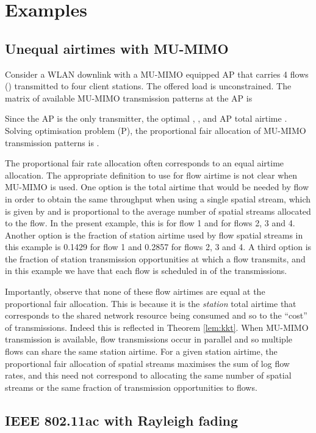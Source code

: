 \documentclass[11pt]{amsart}
\begin{document}
\section{Examples}\label{sec:examples}

\subsection{Unequal airtimes with MU-MIMO} \label{ex:unequal}   Consider a WLAN downlink with a MU-MIMO equipped AP that carries 4 flows () transmitted to four client stations.   The offered load is unconstrained.    The matrix of available MU-MIMO transmission patterns at the AP is

Since the AP is the only transmitter, the optimal , , and AP total airtime .   Solving optimisation problem (P), the proportional fair allocation of MU-MIMO transmission patterns is .    

The proportional fair rate allocation often corresponds to an equal airtime allocation.  The appropriate definition to use for flow airtime is not clear when MU-MIMO is used. One option is the total airtime that would be needed by flow  in order to obtain the same throughput when using a single spatial stream, which is given by  and is proportional to the average number of spatial streams allocated to the flow.   In the present example, this is  for flow 1 and  for flows 2, 3 and 4.  Another option is the fraction of station  airtime  used by flow  spatial streams in this example is 0.1429 for flow 1 and 0.2857 for flows 2, 3 and 4. A third option is the fraction of station transmission opportunities at which a flow transmits, and in this example we have that each flow is scheduled in  of the transmissions.   

Importantly, observe that none of these flow airtimes are equal at the proportional fair allocation.   This is because it is the \emph{station} total airtime that corresponds to the shared network resource being consumed and so to the ``cost'' of transmissions.  Indeed this is reflected in Theorem \ref{lem:kkt}.   When MU-MIMO transmission is available, flow transmissions occur in parallel and so multiple flows can share the same station airtime.  For a given station airtime, the proportional fair allocation of spatial streams maximises  the sum of log flow rates, and this need not correspond to allocating the same number of spatial streams or the same fraction of transmission opportunities to flows.

\subsection{IEEE 802.11ac with Rayleigh fading} \label{sec:exampleac} 
\end{document}
